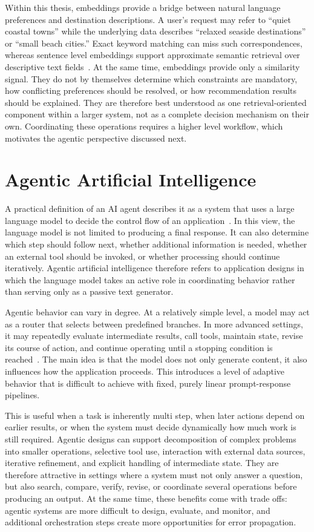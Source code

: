 Within this thesis, embeddings provide a bridge between natural language preferences and destination descriptions. A user's request may refer to ``quiet coastal towns'' while the underlying data describes ``relaxed seaside destinations'' or ``small beach cities.'' Exact keyword matching can miss such correspondences, whereas sentence level embeddings support approximate semantic retrieval over descriptive text fields~\parencite{reimersSentenceBert}. At the same time, embeddings provide only a similarity signal. They do not by themselves determine which constraints are mandatory, how conflicting preferences should be resolved, or how recommendation results should be explained. They are therefore best understood as one retrieval-oriented component within a larger system, not as a complete decision mechanism on their own. Coordinating these operations requires a higher level workflow, which motivates the agentic perspective discussed next.

\section{Agentic Artificial Intelligence}\label{section:background:agentic-ai}
A practical definition of an AI agent describes it as a system that uses a large language model to decide the control flow of an application~\parencite{chaseWhatIsAgent}. In this view, the language model is not limited to producing a final response. It can also determine which step should follow next, whether additional information is needed, whether an external tool should be invoked, or whether processing should continue iteratively. Agentic artificial intelligence therefore refers to application designs in which the language model takes an active role in coordinating behavior rather than serving only as a passive text generator.

Agentic behavior can vary in degree. At a relatively simple level, a model may act as a router that selects between predefined branches. In more advanced settings, it may repeatedly evaluate intermediate results, call tools, maintain state, revise its course of action, and continue operating until a stopping condition is reached~\parencite{chaseWhatIsAgent}. The main idea is that the model does not only generate content, it also influences how the application proceeds. This introduces a level of adaptive behavior that is difficult to achieve with fixed, purely linear prompt-response pipelines.

This is useful when a task is inherently multi step, when later actions depend on earlier results, or when the system must decide dynamically how much work is still required. Agentic designs can support decomposition of complex problems into smaller operations, selective tool use, interaction with external data sources, iterative refinement, and explicit handling of intermediate state. They are therefore attractive in settings where a system must not only answer a question, but also search, compare, verify, revise, or coordinate several operations before producing an output. At the same time, these benefits come with trade offs: agentic systems are more difficult to design, evaluate, and monitor, and additional orchestration steps create more opportunities for error propagation.

